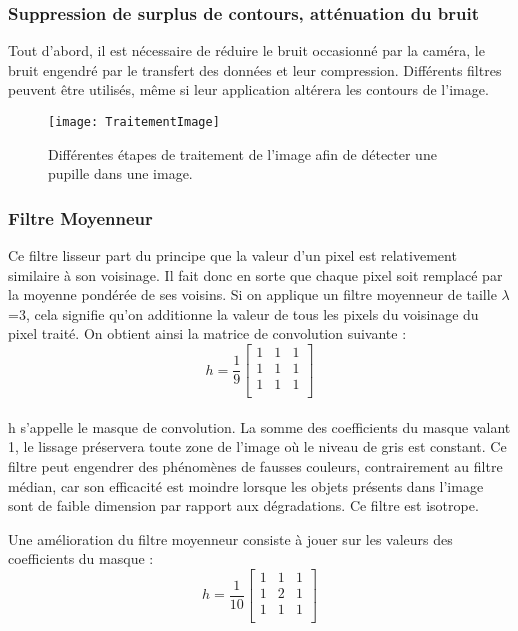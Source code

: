 \subsubsection*{Suppression de surplus de contours, atténuation du bruit}
\label{Filtre}

Tout d’abord, il est nécessaire de réduire le bruit occasionné par la caméra, le bruit engendré par le transfert des données et leur compression. Différents filtres \cite{bergounioux2010quelques} peuvent être utilisés, même si leur application altérera les contours de l’image. 

\begin{figure}[H]
  \centering
  \texttt{[image: TraitementImage]}
  \caption{Différentes étapes de traitement de l’image afin de détecter une pupille dans une image.}
  \label{fig:TraitementImage}
\end{figure}

\subsubsection*{Filtre Moyenneur}

Ce filtre lisseur part du principe que la valeur d'un pixel est relativement similaire à son voisinage. Il fait donc en sorte que chaque pixel soit remplacé par la moyenne pondérée de ses voisins. Si on applique un filtre moyenneur de taille $\lambda$=3, cela signifie qu'on additionne la valeur de tous les pixels du voisinage du pixel traité. On obtient ainsi la matrice de convolution suivante :
$$h = \frac{1}{9}
\begin{bmatrix}
	1 & 1 & 1 \\
	1 & 1 & 1 \\
	1 & 1 & 1 \\
\end{bmatrix}  $$

\paragraph{}
h s’appelle le masque de convolution. La somme des coefficients du masque valant 1, le lissage préservera toute zone de l’image où le niveau de gris est constant. Ce filtre peut engendrer des phénomènes de fausses couleurs, contrairement au filtre médian, car son efficacité est moindre lorsque les objets présents dans l'image sont de faible dimension par rapport aux dégradations. Ce filtre est isotrope. 

Une amélioration du filtre moyenneur consiste à jouer sur les valeurs des coefficients du masque :
$$h = \frac{1}{10}
\begin{bmatrix}
	1 & 1 & 1 \\
	1 & 2 & 1 \\
	1 & 1 & 1 \\
\end{bmatrix}  $$

